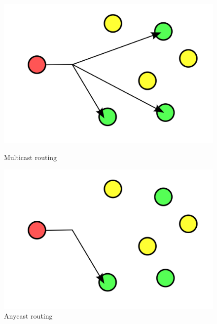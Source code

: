 {\begin{figure}
   \begin{minipage}{.4\textwidth}
   \includegraphics[width=\textwidth]{images/multicast.png}
   \caption[Multicast routing scheme]{Multicast routing}
   \label{fig:multicast}
   \end{minipage}
   \hfill
   \begin{minipage}{.4\textwidth}
   \includegraphics[width=\textwidth]{images/anycast.png}
   \caption[Anycast routing scheme]{Anycast routing}
   \label{fig:anycast}
   \end{minipage}
   \end{figure}
}


\label{sec:network-models}

